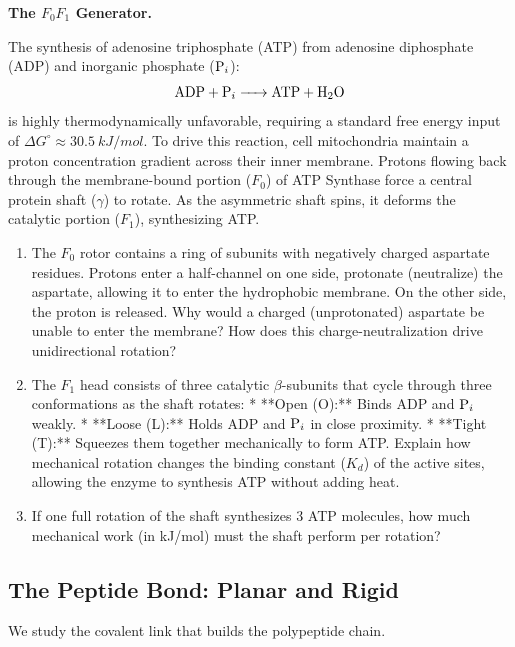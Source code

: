 \documentclass[12pt, a4paper]{book}
\begin{document}
\begin{puzzlebox}
\textbf{The $F_0 F_1$ Generator.}

The synthesis of adenosine triphosphate (ATP) from adenosine diphosphate (ADP) and inorganic phosphate ($\ce{P_i}$):
\[
  \ce{ADP + P_i -> ATP + H2O}
\]
is highly thermodynamically unfavorable, requiring a standard free energy input of $\Delta G^\circ \approx \SI{30.5}{kJ/mol}$.
To drive this reaction, cell mitochondria maintain a proton concentration gradient across their inner membrane.
Protons flowing back through the membrane-bound portion ($F_0$) of ATP Synthase force a central protein shaft ($\gamma$) to rotate. As the asymmetric shaft spins, it deforms the catalytic portion ($F_1$), synthesizing ATP.
\begin{enumerate}[label=(\alph*), leftmargin=*]
  \item The $F_0$ rotor contains a ring of subunits with negatively charged aspartate residues. Protons enter a half-channel on one side, protonate (neutralize) the aspartate, allowing it to enter the hydrophobic membrane. On the other side, the proton is released.
        Why would a charged (unprotonated) aspartate be unable to enter the membrane? How does this charge-neutralization drive unidirectional rotation?
  \item The $F_1$ head consists of three catalytic $\beta$-subunits that cycle through three conformations as the shaft rotates:
        * **Open (O):** Binds ADP and $\ce{P_i}$ weakly.
        * **Loose (L):** Holds ADP and $\ce{P_i}$ in close proximity.
        * **Tight (T):** Squeezes them together mechanically to form ATP.
        Explain how mechanical rotation changes the binding constant ($K_d$) of the active sites, allowing the enzyme to synthesis ATP without adding heat.
  \item If one full rotation of the shaft synthesizes 3 ATP molecules, how much mechanical work (in kJ/mol) must the shaft perform per rotation?
\end{enumerate}
\end{puzzlebox}

\subsection{The Peptide Bond: Planar and Rigid}

We study the covalent link that builds the polypeptide chain.
\end{document}
